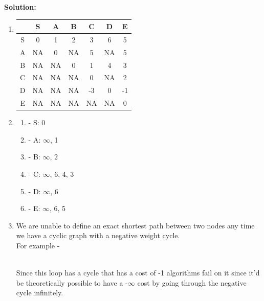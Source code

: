 \documentclass[9pt]{article}
\newcommand{\ben}{\begin{enumerate}}
\newcommand{\een}{\end{enumerate}}
\begin{document}
\textbf{Solution:} \\
\ben 
  \item
    \begin{tabular}{|c|c|c|c|c|c|c|}
    \hline
    & S & A & B & C & D & E \\ [0.5ex]
    \hline
    S &0 &1 &2 &3 &6 &5 \\
    \hline
    A &NA &0 &NA &5 &NA &5 \\
    \hline
    B &NA &NA &0 &1 &4 &3 \\
    \hline
    C &NA &NA &NA &0 &NA &2 \\
    \hline
    D &NA &NA &NA &-3 &0 &-1 \\
    \hline
    E &NA &NA &NA &NA &NA &0 \\
    \hline
    \end{tabular}
  \item 
    \ben
      \item [-] S: 0
      \item [-] A: $\infty$, 1
      \item [-] B: $\infty$, 2
      \item [-] C: $\infty$, 6, 4, 3
      \item [-] D: $\infty$, 6
      \item [-] E: $\infty$, 6, 5
    \een
  \item We are unable to define an exact shortest path between two nodes any time we have a cyclic graph with a negative weight cycle.\\
      For example - \\
        \\
      Since this loop has a cycle that has a cost of -1 algorithms fail on it since it'd be theoretically possible to have a -$\infty$ cost by going through the negative cycle infinitely.
\een
\end{document}
